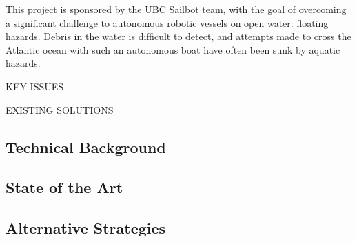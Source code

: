 This project is sponsored by the UBC Sailbot team, with the goal of overcoming a significant challenge to autonomous robotic vessels on open water: floating hazards. Debris in the water is difficult to detect, and attempts made to cross the Atlantic ocean with such an autonomous boat have often been sunk by aquatic hazards.

KEY ISSUES

EXISTING SOLUTIONS

\subsection{\label{sec:intro:technical-background}Technical Background}
\subsection{\label{sec:intro:commercial}State of the Art}
\subsection{\label{sec:intro:alternatives}Alternative Strategies}